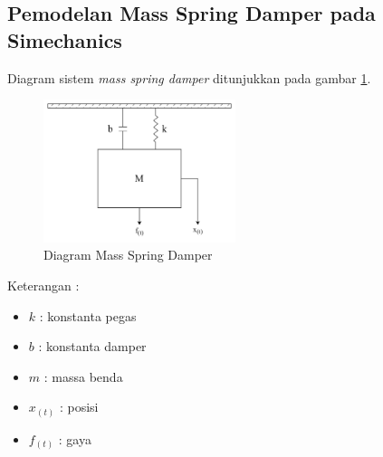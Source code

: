 \documentclass[../main.tex]{subfiles}
\begin{document}
        \subsection{Pemodelan Mass Spring Damper pada Simechanics}
            Diagram sistem \textit{mass spring damper} ditunjukkan pada gambar \ref{diagram_msd}.
            \begin{figure}[H]
                \centering
                \includegraphics[width = 0.5\textwidth]{assets/image/diagram_mass_spring_damper.png}
                \caption{Diagram Mass Spring Damper}
                \label{diagram_msd}
            \end{figure}
            \begin{center}
                Keterangan : 
                \begin{minipage}[c]{8cm}
                    \begin{itemize}
                        \item $k$ : konstanta pegas
                        \item $b$ : konstanta damper
                        \item $m$ : massa benda
                        \item $x_{(t)}$ : posisi
                        \item $f_{(t)}$ : gaya
                    \end{itemize}
                \end{minipage}
            \end{center}
\end{document}
